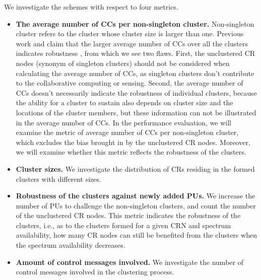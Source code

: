 \documentclass[times]{ettauth}
\newcommand{\ie}{i.e., }
\theoremstyle{mytheoremstyle}
\theoremstyle{mytheoremstyle}
\theoremstyle{mytheoremstyle}
\begin{document}
We investigate the schemes with respect to four metrics.

\begin{itemize}
\item \textbf{The average number of CCs per non-singleton cluster.}
Non-singleton cluster refers to the cluster whose cluster size is larger than one.
Previous work \cite{LIU_TMC11_2} and \cite{Li11_ROSS} claim that the larger average number of CCs over all the clusters indicates robustness , from which we see two flaws.
First, the unclustered CR nodes (synonym of singleton clusters) should not be considered when calculating the average number of CCs, as singleton clusters don't contribute to the collaborative computing or sensing.
Second, the average number of CCs doesn't necessarily indicate the robustness of individual clusters, because the ability for a cluster to sustain also depends on cluster size and the locations of the cluster members, but these information can not be illustrated in the average number of CCs.
In the performance evaluation, we will examine the metric of average number of CCs per non-singleton cluster, which excludes the bias brought in by the unclustered CR nodes.
Moreover, we will examine whether this metric reflects the robustness of the clusters.


\item \textbf{Cluster sizes.}
We investigate the distribution of CRs residing in the formed clusters with different sizes.


\item \textbf{Robustness of the clusters against newly added PUs.}
We increase the number of PUs to challenge the non-singleton clusters, and count the number of the unclustered CR nodes.
This metric indicates the robustness of the clusters, \ie as to the clusters formed for a given CRN and spectrum availability, how many CR nodes can still be benefited from the clusters when the spectrum availability decreases.



\item \textbf{Amount of control messages involved.}
We investigate the number of control messages involved in the clustering process.

\end{itemize}
\end{document}
